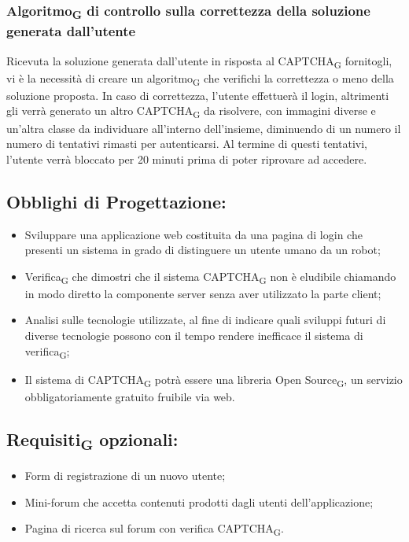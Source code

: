 \subsubsection{Algoritmo\textsubscript{G} di controllo sulla correttezza della soluzione generata dall'utente}
Ricevuta la soluzione generata dall'utente in risposta al CAPTCHA\textsubscript{G} fornitogli, vi è la necessità di creare un algoritmo\textsubscript{G} che verifichi la correttezza o meno della soluzione proposta. In caso di correttezza, l'utente effettuerà il login, altrimenti gli verrà generato un altro CAPTCHA\textsubscript{G} da risolvere, con immagini diverse e un'altra classe da individuare all'interno dell'insieme, diminuendo di un numero il numero di tentativi rimasti per autenticarsi. Al termine di questi tentativi, l'utente verrà bloccato per 20 minuti prima di poter riprovare ad accedere. 

\subsection{Obblighi di Progettazione:}\:
\begin{itemize}
    \item Sviluppare una applicazione web costituita da una pagina di login che presenti un sistema in grado di distinguere un utente umano da un robot;
    \item Verifica\textsubscript{G} che dimostri che il sistema CAPTCHA\textsubscript{G} non è eludibile chiamando in modo diretto la componente server senza aver utilizzato la parte client;
    \item Analisi sulle tecnologie utilizzate, al fine di indicare quali sviluppi futuri di diverse tecnologie possono con il tempo rendere inefficace il sistema di verifica\textsubscript{G};
    \item Il sistema di CAPTCHA\textsubscript{G} potrà essere una libreria Open Source\textsubscript{G}, un servizio obbligatoriamente gratuito fruibile via web.
\end{itemize}

\subsection{Requisiti\textsubscript{G} opzionali:}\:
\begin{itemize}
    \item Form di registrazione di un nuovo utente;
    \item Mini-forum che accetta contenuti prodotti dagli utenti dell'applicazione;
    \item Pagina di ricerca sul forum con verifica CAPTCHA\textsubscript{G}.
\end{itemize}

